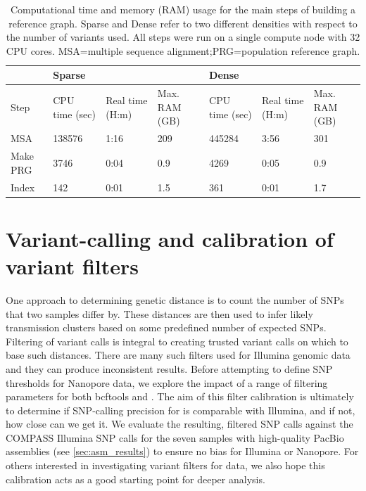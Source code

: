 \begin{table}
\centering
\begin{tabularx}{\textwidth}{|l|X|X|X|X|X|X|}
\hline
         & \multicolumn{3}{l|}{Sparse}                          & \multicolumn{3}{l|}{Dense}                           \\ \hline
Step     & CPU time (sec) & Real time (H:m) & Max. RAM (GB) & CPU time (sec) & Real time (H:m) & Max. RAM (GB) \\ \hline%
MSA      & 138576         & 1:16             & 209              & 445284         & 3:56             & 301              \\ \hline%
Make PRG & 3746           & 0:04             & 0.9              & 4269           & 0:05             & 0.9              \\ \hline%
Index    & 142            & 0:01             & 1.5              & 361            & 0:01             & 1.7              \\ \hline%
\end{tabularx}
\caption{Computational time and memory (RAM) usage for the main steps of building a \mtb{} reference graph. Sparse and Dense refer to two different densities with respect to the number of variants used. All steps were run on a single compute node with 32 CPU cores. MSA=multiple sequence alignment;PRG=population reference graph.}
\label{tab:build-prg}
\end{table}


\section{Variant-calling and calibration of \ont{} variant filters}
\label{sec:var-calls}
One approach to determining genetic distance is to count the number of SNPs that two samples differ by. These distances are then used to infer likely transmission clusters based on some predefined number of expected SNPs.
Filtering of variant calls is integral to creating trusted variant calls on which to base such distances. There are many such filters used for Illumina genomic data
and they can produce inconsistent results\cite{walter2020}. Before
attempting to define SNP thresholds for Nanopore data, we explore the
impact of a range of filtering parameters for both bcftools and \pandora{}.  
The aim of this filter calibration is ultimately to determine if SNP-calling precision for \ont{} is comparable with Illumina, and if not, how close can we get it.
We evaluate the resulting, filtered SNP calls
against the COMPASS \cite{Jajou2019} Illumina SNP calls for the seven
samples with high-quality PacBio assemblies (see \autoref{sec:asm_results}) to ensure no bias for
Illumina or Nanopore.
For others interested in investigating variant filters for \ont{} data, we also hope this calibration acts as a good starting point for deeper analysis.

